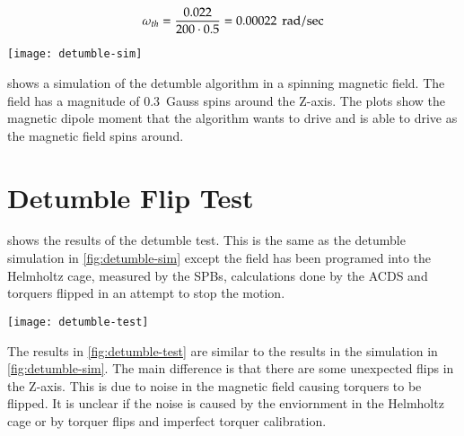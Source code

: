 \begin{equation}
    \omega _ {th} = { 0.022 \over{ {200 \cdot 0.5}}} = 0.00022 ~ \, \mathrm{rad / sec}
\end{equation}

\begin{sidewaysfigure}
    \centering
    \texttt{[image: detumble-sim]}
  \caption{Simulation of torquer output with spinning magnetic field}
    \label{fig:detumble-sim}
\end{sidewaysfigure}


 shows a simulation of the detumble algorithm in a spinning magnetic field. The field has a magnitude of 0.3~Gauss spins around the Z-axis. The plots show the magnetic dipole moment that the algorithm wants to drive and is able to drive as the magnetic field spins around.


\section{Detumble Flip Test}

 shows the results of the detumble test. This is the same as the detumble simulation in \cref{fig:detumble-sim} except the field has been programed into the Helmholtz cage, measured by the \acp{SPB}, calculations done by the \ac{ACDS} and torquers flipped in an attempt to stop the motion.

\begin{sidewaysfigure}
    \centering
    \texttt{[image: detumble-test]}
  \caption{Test of the B-dot controller}
    \label{fig:detumble-test}
\end{sidewaysfigure}

The results in \cref{fig:detumble-test} are similar to the results in the simulation in \cref{fig:detumble-sim}. The main difference is that there are some unexpected flips in the Z-axis. This is due to noise in the magnetic field causing torquers to be flipped. It is unclear if the noise is caused by the enviornment in the Helmholtz cage or by torquer flips and imperfect torquer calibration.


